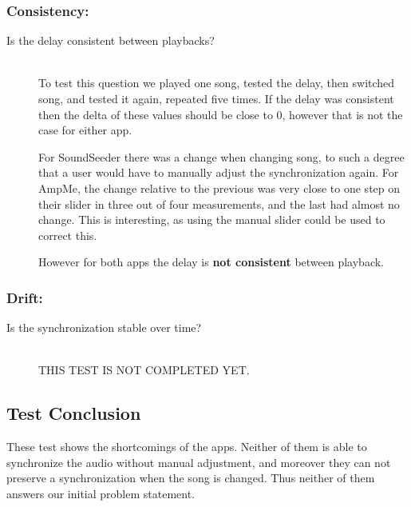 \subsubsection*{Consistency:}
\begin{description}
    \item[Is the delay consistent between playbacks?] \hfill \\
    To test this question we played one song, tested the delay, then switched song, and tested it again, repeated five times. 
    If the delay was consistent then the delta of these values should be close to $0$, however that is not the case for either app. 

    For SoundSeeder there was a change when changing song, to such a degree that a user would have to manually adjust the synchronization again.
    For AmpMe, the change relative to the previous was very close to one step on their slider in three out of four measurements, and the last had almost no change. 
    This is interesting, as using the manual slider could be used to correct this. 

    However for both apps the delay is \textbf{not consistent} between playback.
\end{description}

\subsubsection*{Drift:}
\begin{description}
    \item[Is the synchronization stable over time?] \hfill \\
    THIS TEST IS NOT COMPLETED YET. 
\end{description}

\subsection{Test Conclusion}
These test shows the shortcomings of the apps. 
Neither of them is able to synchronize the audio without manual adjustment, and moreover they can not preserve a synchronization when the song is changed. 
Thus neither of them answers our initial problem statement. 
